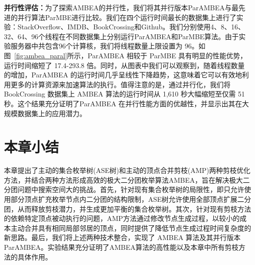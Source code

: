 \textbf{并行性评估：}为了探索AMBEA的并行性，我们将其并行版本ParAMBEA与最先进的并行算法ParMBE进行比较。我们在四个运行时间最长的数据集上进行了实验：StackOverflow、IMDB、BookCrossing和Github。我们分别使用4、8、16、32、64、96个线程在不同数据集上分别运行ParAMBEA和ParMBE算法。由于实验服务器中共包含96个计算核，我们将线程数量上限设置为 96。如图~\ref{fig:ambea_paral}所示，ParAMBEA 相较于 ParMBE 具有明显的性能优势，运行时间缩短了 17.4-293.8 倍。同时，从图表中我们可以观察到，随着线程数量的增加，ParAMBEA 的运行时间几乎呈线性下降趋势，这意味着它可以有效地利用更多的计算资源来加速算法的执行。值得注意的是，通过并行化，我们将 BookCrossing 数据集上 AMBEA 算法的运行时间从 1,610 秒大幅缩短至仅需 51 秒。这个结果充分证明了ParAMBEA 在并行性能方面的优越性，并显示出其在大规模数据集上的应用潜力。

\section{本章小结}

本章提出了主动的集合枚举树(ASE树)和主动的顶点合并剪枝(AMP)两种剪枝优化方法，并结合两种方法形成高效的极大二分团枚举算法AMBEA，旨在解决极大二分团问题中搜索空间大的挑战。首先，针对现有集合枚举树的局限性，即只允许使用部分顶点扩充枚举节点内二分团的结构限制，ASE树允许使用全部顶点扩展二分团，从而释放剪枝潜力，并生成更加平衡的集合枚举树。其次，针对现有剪枝方法的依赖特定顶点被动执行的问题，AMP方法通过修改节点生成过程，以较小的成本主动合并具有相同局部邻居的顶点，同时提供了降低节点生成过程时间复杂度的新思路。最后，我们将上述两种技术整合，实现了 AMBEA 算法及其并行版本 ParAMBEA。实验结果充分证明了AMBEA算法的高性能以及本章中所有剪枝方法的具体作用。
